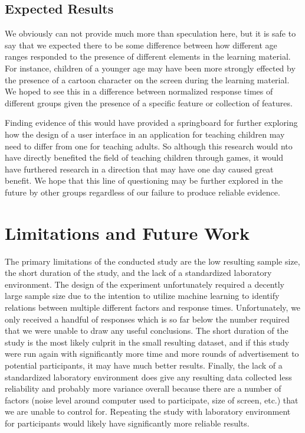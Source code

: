 \documentclass[12pt]{report}
\begin{document}
\section{Expected Results}

We obviously can not provide much more than speculation here, but it is safe to say that we expected there to be some difference between how different age ranges responded to the presence of different elements in the learning material. For instance, children of a younger age may have been more strongly effected by the presence of a cartoon character on the screen during the learning material. We hoped to see this in a difference between normalized response times of different groups given the presence of a specific feature or collection of features.

Finding evidence of this would have provided a springboard for further exploring how the design of a user interface in an application for teaching children may need to differ from one for teaching adults. So although this research would nto have directly benefited the field of teaching children through games, it would have furthered research in a direction that may have one day caused great benefit. We hope that this line of questioning may be further explored in the future by other groups regardless of our failure to produce reliable evidence.

\chapter{Limitations and Future Work}

The primary limitations of the conducted study are the low resulting sample size, the short duration of the study, and the lack of a standardized laboratory environment. The design of the experiment unfortunately required a decently large sample size due to the intention to utilize machine learning to identify relations between multiple different factors and response times. Unfortunately, we only received a handful of responses which is so far below the number required that we were unable to draw any useful conclusions. The short duration of the study is the most likely culprit in the small resulting dataset, and if this study were run again with significantly more time and more rounds of advertisement to potential participants, it may have much better results. Finally, the lack of a standardized laboratory environment does give any resulting data collected less reliability and probably more variance overall because there are a number of factors (noise level around computer used to participate, size of screen, etc.) that we are unable to control for. Repeating the study with laboratory environment for participants would likely have significantly more reliable results.
\end{document}

